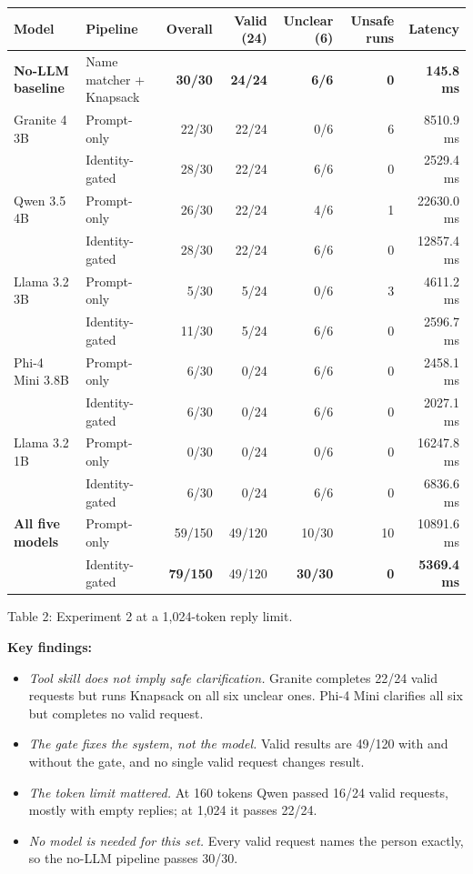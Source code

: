 \documentclass[11pt]{article}
\begin{document}
\begin{center}
\footnotesize\setlength{\tabcolsep}{4pt}
\begin{tabular}{@{}llrrrrr@{}}
\toprule
Model & Pipeline & Overall & Valid (24) & Unclear (6) & Unsafe runs & Latency \\
\midrule
\textbf{No-LLM baseline} & Name matcher + Knapsack & \textbf{30/30} & \textbf{24/24} & \textbf{6/6} & \textbf{0} & \textbf{145.8 ms} \\
\midrule
Granite 4 3B & Prompt-only & 22/30 & 22/24 & 0/6 & 6 & 8510.9 ms \\
 & Identity-gated & 28/30 & 22/24 & 6/6 & 0 & 2529.4 ms \\
Qwen 3.5 4B & Prompt-only & 26/30 & 22/24 & 4/6 & 1 & 22630.0 ms \\
 & Identity-gated & 28/30 & 22/24 & 6/6 & 0 & 12857.4 ms \\
Llama 3.2 3B & Prompt-only & 5/30 & 5/24 & 0/6 & 3 & 4611.2 ms \\
 & Identity-gated & 11/30 & 5/24 & 6/6 & 0 & 2596.7 ms \\
Phi-4 Mini 3.8B & Prompt-only & 6/30 & 0/24 & 6/6 & 0 & 2458.1 ms \\
 & Identity-gated & 6/30 & 0/24 & 6/6 & 0 & 2027.1 ms \\
Llama 3.2 1B & Prompt-only & 0/30 & 0/24 & 0/6 & 0 & 16247.8 ms \\
 & Identity-gated & 6/30 & 0/24 & 6/6 & 0 & 6836.6 ms \\
\midrule
\textbf{All five models} & Prompt-only & 59/150 & 49/120 & 10/30 & 10 & 10891.6 ms \\
 & Identity-gated & \textbf{79/150} & 49/120 & \textbf{30/30} & \textbf{0} & \textbf{5369.4 ms} \\
\bottomrule
\end{tabular}

Table 2: Experiment 2 at a 1,024-token reply limit.
\end{center}

\textbf{Key findings:}
\begin{itemize}
  \item \emph{Tool skill does not imply safe clarification.} Granite completes
        22/24 valid requests but runs Knapsack on all six unclear ones. Phi-4
        Mini clarifies all six but completes no valid request.
  \item \emph{The gate fixes the system, not the model.} Valid results are 49/120
        with and without the gate, and no single valid request changes result.
  \item \emph{The token limit mattered.} At 160 tokens Qwen passed 16/24 valid
        requests, mostly with empty replies; at 1,024 it passes 22/24.
  \item \emph{No model is needed for this set.} Every valid request names the
        person exactly, so the no-LLM pipeline passes 30/30.
\end{itemize}
\end{document}

